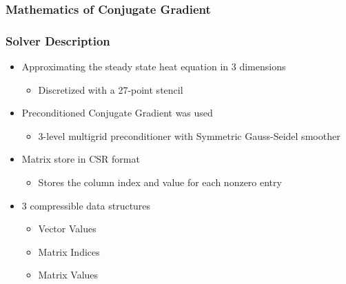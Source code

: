 \documentclass{beamer}
\begin{document}
	\begin{frame}
		\frametitle{Mathematics of Conjugate Gradient}
		\centering
	\end{frame}
\fi

\begin{frame}
	\frametitle{Solver Description}
	\begin{itemize}
		\item Approximating the steady state heat equation in 3 dimensions
		\begin{itemize}
			\item Discretized with a 27-point stencil
		\end{itemize}
		\pause
		\item Preconditioned Conjugate Gradient was used
		\begin{itemize}
			\item 3-level multigrid preconditioner with Symmetric Gauss-Seidel smoother
		\end{itemize}
		\pause
		\item Matrix store in CSR format
		\begin{itemize}
			\item Stores the column index and value for each nonzero entry
		\end{itemize}
		\pause
		\item 3 compressible data structures
		\begin{itemize}
			\item Vector Values
			\item Matrix Indices
			\item Matrix Values
		\end{itemize}
	\end{itemize}
\end{frame}
\end{document}
